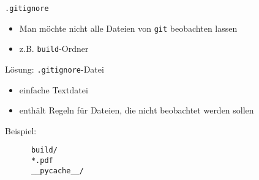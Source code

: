 \begin{frame}[fragile]{\texttt{.gitignore}}
    \begin{itemize}
    \item Man möchte nicht alle Dateien von \texttt{git} beobachten lassen
    \item z.B. \texttt{build}-Ordner
    \end{itemize}
    \begin{center}
        \Large Lösung: \texttt{.gitignore}-Datei
    \end{center}

    \begin{itemize}
    \item einfache Textdatei
    \item enthält Regeln für Dateien, die nicht beobachtet werden sollen
    \end{itemize}
    Beispiel:
    \vspace{1em}
    \begin{verbatim}
      build/
      *.pdf
      __pycache__/
    \end{verbatim}
\end{frame}


